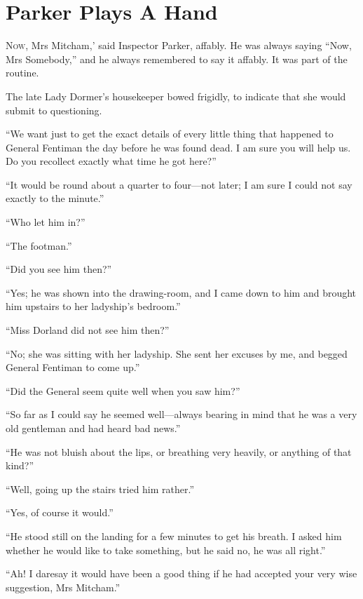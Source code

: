\chapter{Parker Plays A Hand}

\lettrine[lines=4,ante=‘]{N}{ow}, Mrs Mitcham,' said Inspector Parker, affably. He was always saying \enquote{Now, Mrs Somebody,} and he always remembered to say it affably. It was part of the routine.

\zz
The late Lady Dormer's housekeeper bowed frigidly, to indicate that she would submit to questioning.

\enquote{We want just to get the exact details of every little thing that happened to General Fentiman the day before he was found dead. I am sure you will help us. Do you recollect exactly what time he got here?}

\enquote{It would be round about a quarter to four\allowbreak---\allowbreak not later; I am sure I could not say exactly to the minute.}

\enquote{Who let him in?}

\enquote{The footman.}

\enquote{Did you see him then?}

\enquote{Yes; he was shown into the drawing-room, and I came down to him and brought him upstairs to her ladyship's bedroom.}

\enquote{Miss Dorland did not see him then?}

\enquote{No; she was sitting with her ladyship. She sent her excuses by me, and begged General Fentiman to come up.}

\enquote{Did the General seem quite well when you saw him?}

\enquote{So far as I could say he seemed well\allowbreak---\allowbreak always bearing in mind that he was a very old gentleman and had heard bad news.}

\enquote{He was not bluish about the lips, or breathing very heavily, or anything of that kind?}

\enquote{Well, going up the stairs tried him rather.}

\enquote{Yes, of course it would.}

\enquote{He stood still on the landing for a few minutes to get his breath. I asked him whether he would like to take something, but he said no, he was all right.}

\enquote{Ah! I daresay it would have been a good thing if he had accepted your very wise suggestion, Mrs Mitcham.}

